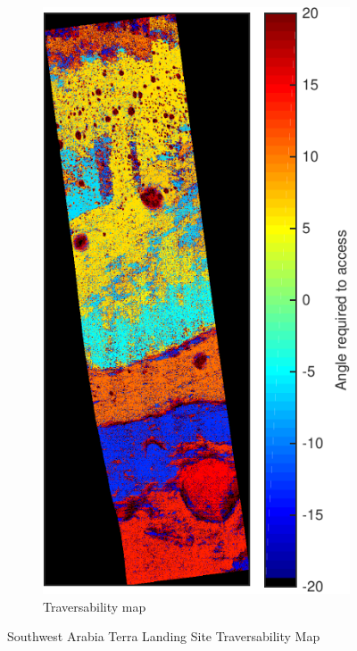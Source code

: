 \documentclass[12pt]{article}
\begin{document}
\begin{figure}[h!]
  ~
  \begin{subfigure}[t]{0.33\textwidth}
    \centering
    \includegraphics[height=0.5\paperheight]{figures/maps/ESP_011844_1855/DTEEC_011844_1855_002812_1855_A01-traversability_map.pdf}
    \caption{Traversability map}
    \label{fig:southwest_traversability}
  \end{subfigure}
  \caption{Southwest Arabia Terra Landing Site Traversability Map}
  \label{fig:southwest}
\end{figure}
\end{document}
